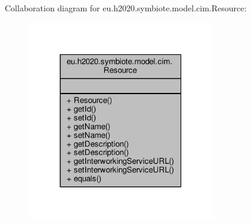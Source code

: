 Collaboration diagram for eu.\+h2020.\+symbiote.\+model.\+cim.\+Resource\+:\nopagebreak
\begin{figure}[H]
\begin{center}
\leavevmode
\includegraphics[width=232pt]{classeu_1_1h2020_1_1symbiote_1_1model_1_1cim_1_1Resource__coll__graph}
\end{center}
\end{figure}
